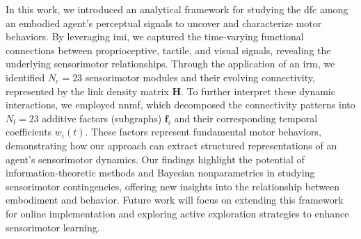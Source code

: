 In this work, we introduced an analytical framework for studying the \ac{dfc} among an embodied agent's perceptual signals to uncover and characterize motor behaviors. By leveraging \ac{imi}, we captured the time-varying functional connections between proprioceptive, tactile, and visual signals, revealing the underlying sensorimotor relationships. Through the application of an \ac{irm}, we identified $N_\text{c} = 23$ sensorimotor modules and their evolving connectivity, represented by the link density matrix $\bm{H}$. To further interpret these dynamic interactions, we employed \ac{nnmf}, which decomposed the connectivity patterns into $N_\text{f} = 23$ additive factors (subgraphs) $\bm{f}_i$ and their corresponding temporal coefficients $w_i(t)$. These factors represent fundamental motor behaviors, demonstrating how our approach can extract structured representations of an agent’s sensorimotor dynamics. Our findings highlight the potential of information-theoretic methods and Bayesian nonparametrics in studying sensorimotor contingencies, offering new insights into the relationship between embodiment and behavior. Future work will focus on extending this framework for online implementation and exploring active exploration strategies to enhance sensorimotor learning.

\printbibliography 
